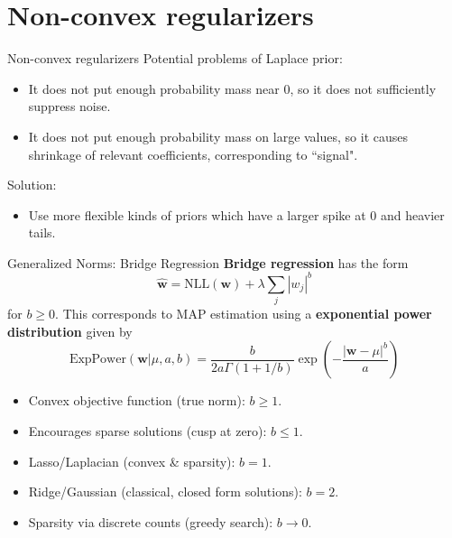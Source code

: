 \documentclass[10pt,mathserif]{beamer}
\begin{document}
\section{Non-convex regularizers}
\begin{frame}{Non-convex regularizers}
Potential problems of Laplace prior:
\begin{itemize}
    \item It does not put enough probability mass near $0$, so it does not sufficiently suppress noise.
    \item It does not put enough probability mass on large values, so it causes shrinkage of relevant coefficients, corresponding to ``signal".
\end{itemize}
Solution:
\begin{itemize}
    \item Use more flexible kinds of priors which have a larger spike at $0$ and heavier tails.
\end{itemize}
\end{frame}

\begin{frame}{Generalized Norms: Bridge Regression}
\textbf{Bridge regression} has the form
\begin{equation*}
  \hat{\bm{w}} = \text{NLL}(\bm{w}) + \lambda \sum_j |w_j|^b
\end{equation*}
for $b \geq 0$. This corresponds to MAP estimation using a \textbf{exponential power distribution} given by
\begin{equation*}
  \text{ExpPower}(\bm{w}|\mu,a,b) = \frac{b}{2a\Gamma(1 + 1/b)} \exp(-\frac{|\bm{w}-\mu|^b}{a}) 
\end{equation*}

\begin{itemize}
    \item  Convex objective function (true norm): $b\geq1$.
    \item  Encourages sparse solutions (cusp at zero): $b\leq1$.
    \item  Lasso/Laplacian (convex \& sparsity): $b=1$.
    \item  Ridge/Gaussian (classical, closed form solutions): $b = 2$.
    \item  Sparsity via discrete counts (greedy search): $b \rightarrow 0$.
    \end{itemize}    
\end{frame}
\end{document}
